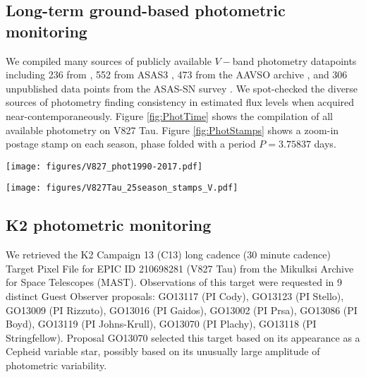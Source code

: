\documentclass[twocolumn]{emulateapj}%
\begin{document}
\subsection{Long-term ground-based photometric monitoring} \label{sec:archival_phot}

We compiled many sources of publicly available $V-$band photometry datapoints including 236 from \citep{grankin08}, 552 from ASAS3 \citep{pojmanski04}, 473 from the AAVSO archive \citep{kafka16}, and 306 unpublished data points from the ASAS-SN survey \citep{shappee14}.  We spot-checked the diverse sources of photometry finding consistency in estimated flux levels when acquired near-contemporaneously. Figure \ref{fig:PhotTime} shows the compilation of all available photometry on V827 Tau.  Figure \ref{fig:PhotStamps} shows a zoom-in postage stamp on each season, phase folded with a period $P=3.75837$ days.

\begin{figure*}
 \centering
 \texttt{[image: figures/V827\_phot1990-2017.pdf]}
 \caption{Compilation of archival and new flux measurements in $V-$band for V827 Tau, normalized to the global maximum flux value, which occurred in 1990.  The y-axis equals the minimum starspot area, when flux deficits are interpreted with the simplest possible analytic starspot model.}
 \label{fig:PhotTime}
\end{figure*}

\begin{figure*}
 \centering
 \texttt{[image: figures/V827Tau\_25season\_stamps\_V.pdf]}
 \caption{Phase-folded $V-$band flux measurements of V827 Tau grouped into 25 observing seasons, and normalized to the global maximum in 1990.  The y-axis equals the minimum starspot area, when flux deficits are interpreted with the simplest possible analytic starspot model.}
 \label{fig:PhotStamps}
\end{figure*}

\subsection{K2 photometric monitoring} \label{sec:K2_obs}

We retrieved the K2 Campaign 13 (C13) \cite{2014PASP..126..398H} long cadence (30 minute cadence) Target Pixel File for EPIC ID 210698281 (V827 Tau) from the Mikulksi Archive for Space Telescopes (MAST).  Observations of this target were requested in 9 distinct Guest Observer proposals: GO13117 (PI Cody), GO13123 (PI Stello), GO13009 (PI Rizzuto), GO13016 (PI Gaidos), GO13002 (PI Prsa), GO13086 (PI Boyd), GO13119 (PI Johns-Krull), GO13070 (PI Plachy), GO13118 (PI Stringfellow).  Proposal GO13070 selected this target based on its appearance as a Cepheid variable star, possibly based on its unusually large amplitude of photometric variability.
\end{document}
